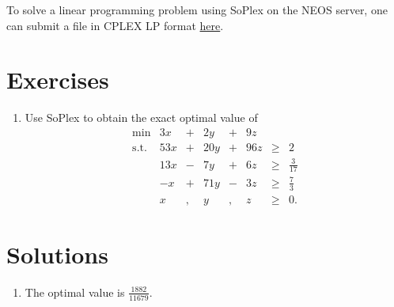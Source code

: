 To solve a linear programming problem using SoPlex on the NEOS server,
one can submit a file in CPLEX LP format
\href{https://neos-server.org/neos/solvers/lp:SoPlex80bit/LP.html}{here}.

\section*{Exercises}\label{exercises-9}

\begin{enumerate}
\def\labelenumi{\arabic{enumi}.}
\tightlist
\item
  Use SoPlex to obtain the exact optimal value of
  \[\begin{array}{rrcrcrcl}
  \min & 3 x & + & 2 y & + & 9 z \\
  \text{s.t.} & 53 x & + & 20 y & + & 96 z & \geq & 2 \\
   & 13 x & - & 7 y & + & 6 z & \geq & \frac{3}{17} \\
   & -x & + & 71 y & - & 3 z & \geq & \frac{7}{3} \\
   & x &, & y &,  &z  &\geq & 0.
  \end{array}\]
\end{enumerate}

\section*{Solutions}\label{solutions-9}

\begin{enumerate}
\def\labelenumi{\arabic{enumi}.}
\tightlist
\item
  The optimal value is \(\frac{1882}{11679}\).
\end{enumerate}

